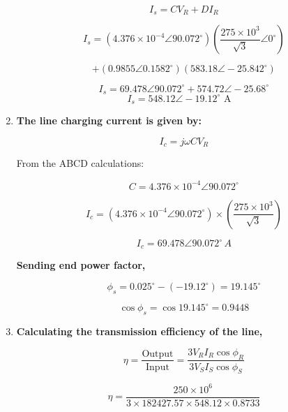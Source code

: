 \documentclass[12pt]{article}
\begin{document}
\begin{enumerate}
	\begin{equation}
		I_s = C V_R + D I_R
	\end{equation}
	
	
	\[  I_s = \left( 4.376 \times 10^{-4} \angle 90.072^\circ \right) \left( \frac{275 \times 10^3}{\sqrt{3}} \angle 0^\circ \right)   \]
	
	
	\[+ \left( 0.9855 \angle 0.1582^\circ \right) (583.18 \angle -25.842^\circ) \]	
	
	\[ I_s = 69.478 \angle 90.072^\circ + 574.72 \angle -25.68^\circ \]
	\begin{equation}
		I_s = 548.12 \angle -19.12^\circ \text{ A} \quad 
	\end{equation}
	
	\item \textbf{The line charging current is given by:} 
	
	\begin{equation}
		I_c = j\omega C V_R
	\end{equation}
	
	From the ABCD calculations:
	

	\[C = 4.376 \times 10^{-4} \angle 90.072^\circ \]
	
	
	\[I_c = \left( 4.376 \times 10^{-4} \angle 90.072^\circ \right) \times \left( \frac{275 \times 10^3}{\sqrt{3}} \right) \]
	
	\begin{equation}
		I_c = 69.478 \angle 90.072^\circ \, A
	\end{equation}
	
	
	\textbf{Sending end power factor,}
	
	\begin{equation}
		\phi_s = 0.025^\circ - (-19.12^\circ) = 19.145^\circ
	\end{equation}
	
	\begin{equation}
		\cos\phi_s = \cos 19.145^\circ = 0.9448
	\end{equation}
	
	
	
	\item \textbf{Calculating the transmission efficiency of the  line,}
	
	\begin{equation}
		\eta = \frac{\text{Output}}{\text{Input}} = \frac{3 V_R I_R \cos \phi_R}{3 V_S I_S \cos \phi_S}
	\end{equation}
	
	
	\[ \eta = \frac{250 \times 10^6}{3 \times 182427.57 \times 548.12 \times 0.8733}  \]
	

\end{enumerate}
\end{document}

